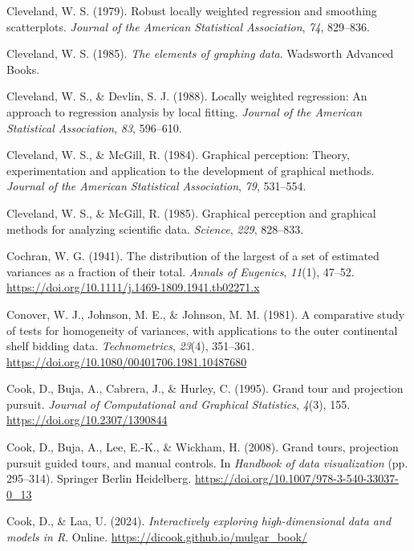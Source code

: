 \documentclass[
  letterpaper,
  10pt,
  krantz2]{krantz}
\newlength{\cslhangindent}
\newenvironment{CSLReferences}[2] %
 {\begin{list}{}{%
  \setlength{\itemindent}{0pt}
  \setlength{\leftmargin}{0pt}
  \setlength{\parsep}{0pt}
  \ifodd #1
   \setlength{\leftmargin}{\cslhangindent}
   \setlength{\itemindent}{-1\cslhangindent}
  \fi
  \setlength{\itemsep}{#2\baselineskip}}}
 {\end{list}}
\begin{document}
{\begin{CSLReferences}{1}{0}
Cleveland, W. S. (1979). Robust locally weighted regression and
smoothing scatterplots. \emph{Journal of the American Statistical
Association}, \emph{74}, 829--836.

Cleveland, W. S. (1985). \emph{The elements of graphing data}. Wadsworth
Advanced Books.

Cleveland, W. S., \& Devlin, S. J. (1988). Locally weighted regression:
An approach to regression analysis by local fitting. \emph{Journal of
the American Statistical Association}, \emph{83}, 596--610.

Cleveland, W. S., \& McGill, R. (1984). Graphical perception: Theory,
experimentation and application to the development of graphical methods.
\emph{Journal of the American Statistical Association}, \emph{79},
531--554.

Cleveland, W. S., \& McGill, R. (1985). Graphical perception and
graphical methods for analyzing scientific data. \emph{Science},
\emph{229}, 828--833.

Cochran, W. G. (1941). The distribution of the largest of a set of
estimated variances as a fraction of their total. \emph{Annals of
Eugenics}, \emph{11}(1), 47--52.
\url{https://doi.org/10.1111/j.1469-1809.1941.tb02271.x}

Conover, W. J., Johnson, M. E., \& Johnson, M. M. (1981). A comparative
study of tests for homogeneity of variances, with applications to the
outer continental shelf bidding data. \emph{Technometrics},
\emph{23}(4), 351--361.
\url{https://doi.org/10.1080/00401706.1981.10487680}

Cook, D., Buja, A., Cabrera, J., \& Hurley, C. (1995). Grand tour and
projection pursuit. \emph{Journal of Computational and Graphical
Statistics}, \emph{4}(3), 155. \url{https://doi.org/10.2307/1390844}

Cook, D., Buja, A., Lee, E.-K., \& Wickham, H. (2008). Grand tours,
projection pursuit guided tours, and manual controls. In \emph{Handbook
of data visualization} (pp. 295--314). Springer Berlin Heidelberg.
\url{https://doi.org/10.1007/978-3-540-33037-0_13}

Cook, D., \& Laa, U. (2024). \emph{Interactively exploring
high-dimensional data and models in {R}}. Online.
\url{https://dicook.github.io/mulgar_book/}


\end{CSLReferences}}
\end{document}
